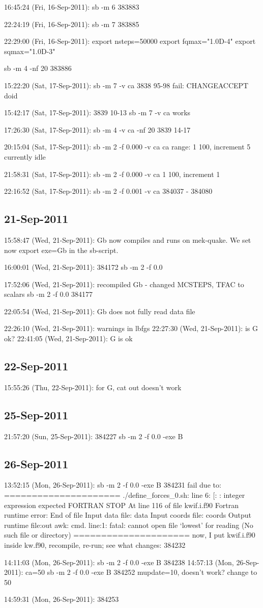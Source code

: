 16:45:24 (Fri, 16-Sep-2011):
	sb -m 6
	383883
	
22:24:19 (Fri, 16-Sep-2011):
	sb -m 7
	383885

22:29:00 (Fri, 16-Sep-2011):
	export nsteps=50000
	export fqmax="1.0D-4"
	export sqmax="1.0D-3"

	sb -m 4 -nf 20
	383886

15:22:20 (Sat, 17-Sep-2011):
	sb -m 7 -v ca
	3838 95-98
	fail: CHANGEACCEPT doid

15:42:17 (Sat, 17-Sep-2011):
	3839 10-13
	sb -m 7 -v ca
	works

17:26:30 (Sat, 17-Sep-2011):
	sb -m 4 -v ca -nf 20
	3839 14-17

20:15:04 (Sat, 17-Sep-2011):
	sb -m 2 -f 0.000 -v ca 
	ca range:
	1 100, increment 5
	currently idle

21:58:31 (Sat, 17-Sep-2011):
	sb -m 2 -f 0.000 -v ca
	1 100, increment 1

	
22:16:52 (Sat, 17-Sep-2011):
	sb -m 2 -f 0.001 -v ca
	384037 - 384080



\subsection{21-Sep-2011}


15:58:47 (Wed, 21-Sep-2011):
	Gb now compiles and runs on mek-quake. We
	set now 
		export exe=Gb 
	in the sb-script.
	
16:00:01 (Wed, 21-Sep-2011):
	384172
	sb -m 2 -f 0.0

17:52:06 (Wed, 21-Sep-2011):
	recompiled Gb - changed MCSTEPS, TFAC to scalars
	sb -m 2 -f 0.0
	384177

22:05:54 (Wed, 21-Sep-2011):
	Gb does not fully read data file
	
22:26:10 (Wed, 21-Sep-2011):
	warnings in lbfgs
22:27:30 (Wed, 21-Sep-2011):
	is G ok?
22:41:05 (Wed, 21-Sep-2011):
	G is ok

\subsection{	22-Sep-2011}

15:55:26 (Thu, 22-Sep-2011):
	for G, cat out doesn't work
\subsection{25-Sep-2011}

21:57:20 (Sun, 25-Sep-2011):
	384227
	sb -m 2 -f 0.0 -exe B
\subsection{26-Sep-2011}
	13:52:15 (Mon, 26-Sep-2011):
	sb -m 2 -f 0.0 -exe B
	384231
	fail due to:
=====================
./define_forces_0.sh: line 6: [: : integer expression expected
FORTRAN STOP
At line 116 of file kwif.i.f90
Fortran runtime error: End of file
Input data file:    data
Input coords file:  coords
Output runtime file:out
awk: cmd. line:1: fatal: cannot open file `lowest' for reading (No such file or directory)
=====================
now, I put kwif.i.f90 inside kw.f90, recompile, re-run; see 
what changes:
	384232

14:11:03 (Mon, 26-Sep-2011):
	sb -m 2 -f 0.0 -exe B
	384238
14:57:13 (Mon, 26-Sep-2011):
	ca=50
	sb -m 2 -f 0.0 -exe B
	384252
mupdate=10, doesn't work?
	change to 50

14:59:31 (Mon, 26-Sep-2011):
	384253

